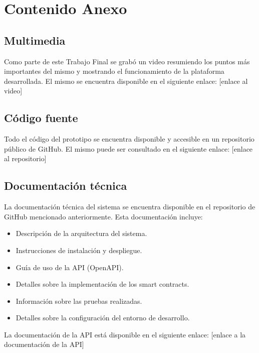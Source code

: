 \chapter{Contenido Anexo}
\label{cp:annex-content}

\parindent0pt

\section{Multimedia}

Como parte de este Trabajo Final se grabó un video resumiendo los puntos más importantes del mismo y mostrando el funcionamiento de la plataforma desarrollada. El mismo se encuentra disponible en el siguiente enlace: [enlace al video] %

\section{Código fuente}

Todo el código del prototipo se encuentra disponible y accesible en un repositorio público de GitHub. El mismo puede ser consultado en el siguiente enlace: [enlace al repositorio] %

\section{Documentación técnica}

La documentación técnica del sistema se encuentra disponible en el repositorio de GitHub mencionado anteriormente. Esta documentación incluye:
\begin{itemize}
		\item Descripción de la arquitectura del sistema.
		\item Instrucciones de instalación y despliegue.
		\item Guía de uso de la API (OpenAPI).
		\item Detalles sobre la implementación de los smart contracts.
		\item Información sobre las pruebas realizadas.
		\item Detalles sobre la configuración del entorno de desarrollo.
\end{itemize}


La documentación de la API está disponible en el siguiente enlace: [enlace a la documentación de la API] %
